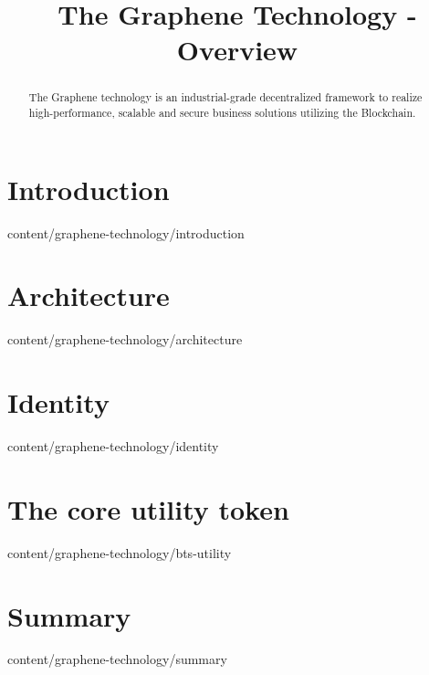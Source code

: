 \documentclass{btswhitepaper}
\title{The Graphene Technology - Overview}
\begin{document}
\maketitle

\begin{abstract}%
 The Graphene technology is an industrial-grade decentralized framework to realize 
high-performance, scalable and secure business solutions utilizing the Blockchain.
\end{abstract}

\section { Introduction            }  { content/graphene-technology/introduction } 

\section { Architecture            }  { content/graphene-technology/architecture } 

\section { Identity                }  { content/graphene-technology/identity     } 

\section { The core utility token }  { content/graphene-technology/bts-utility  } 

\section { Summary }  { content/graphene-technology/summary  } 



\end{document}
